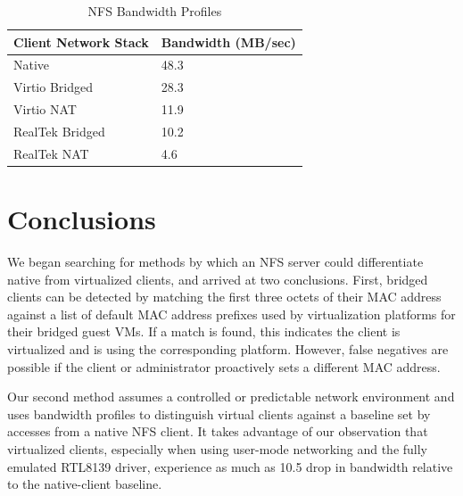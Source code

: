 \documentclass[11pt,pdftex,twocolumn]{article}
\begin{document}
\begin{table}[htb]
	\centering
		\begin{tabular}{|l|l|}
			\hline
			\textbf{Client Network Stack} & \textbf{Bandwidth} (MB/sec) \\
			\hline
			Native & 48.3 \\
			Virtio Bridged & 28.3 \\
			Virtio NAT & 11.9 \\
			RealTek Bridged & 10.2 \\
			RealTek NAT & 4.6 \\
			\hline
		\end{tabular}
	\caption{NFS Bandwidth Profiles}
	\label{tab:NFSBandwidthProfiles}
\end{table}



\section{Conclusions}
We began searching for methods by which an NFS server could differentiate native from virtualized clients, and arrived at two conclusions. First, bridged clients can be detected by matching the first three octets of their MAC address against a list of default MAC address prefixes used by virtualization platforms for their bridged guest VMs. If a match is found, this indicates the client is virtualized and is using the corresponding platform. However, false negatives are possible if the client or administrator proactively sets a different MAC address. 

Our second method assumes a controlled or predictable network environment and uses bandwidth profiles to distinguish virtual clients against a baseline set by accesses from a native NFS client. It takes advantage of our observation that virtualized clients, especially when using user-mode networking and the fully emulated RTL8139 driver, experience as much as 10.5 drop in bandwidth relative to the native-client baseline. 
\end{document}
